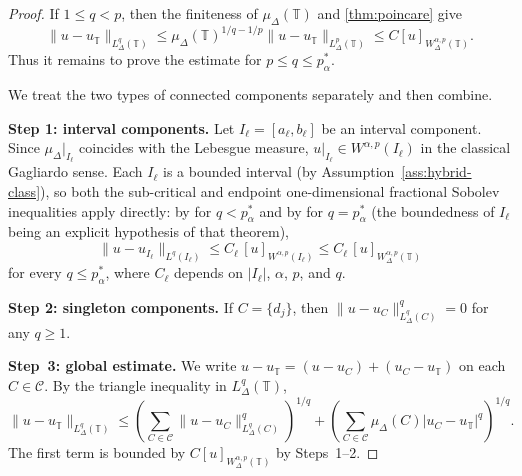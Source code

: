 \documentclass[11pt,a4paper]{article}
\numberwithin{equation}{section}
\theoremstyle{definition}
\newcommand{\T}{\mathbb{T}}
\begin{document}
\begin{proof}
If $1\le q<p$, then the finiteness of $\mu_\Delta(\T)$ and \cref{thm:poincare} give
\[
\|u-u_\T\|_{L^q_\Delta(\T)}
\le \mu_\Delta(\T)^{1/q-1/p}\|u-u_\T\|_{L^p_\Delta(\T)}
\le C [u]_{W^{\alpha,p}_\Delta(\T)}.
\]
Thus it remains to prove the estimate for $p\le q\le p_\alpha^*$.

We treat the two types of connected components separately and then combine.

\medskip\noindent
\textbf{Step 1: interval components.}
Let $I_\ell=[a_\ell,b_\ell]$ be an interval component. Since
$\mu_\Delta|_{I_\ell}$ coincides with the Lebesgue measure,
$u|_{I_\ell}\in W^{\alpha,p}(I_\ell)$ in the classical Gagliardo sense.
Each $I_\ell$ is a bounded interval (by Assumption~\ref{ass:hybrid-class}),
so both the sub-critical and endpoint one-dimensional fractional Sobolev
inequalities apply directly:
by \cite[Theorem~6.7]{DiNezzaPalatucciValdinoci2012} for $q<p^*_\alpha$
and by \cite[Theorem~8.2]{DiNezzaPalatucciValdinoci2012} for $q=p^*_\alpha$
(the boundedness of $I_\ell$ being an explicit hypothesis of that theorem),
\[
\|u - u_{I_\ell}\|_{L^q(I_\ell)}
\le C_\ell\,[u]_{W^{\alpha,p}(I_\ell)}
\le C_\ell\,[u]_{W^{\alpha,p}_\Delta(\T)}
\]
for every $q\le p^*_\alpha$, where $C_\ell$ depends on $|I_\ell|$,
$\alpha$, $p$, and $q$.

\medskip\noindent
\textbf{Step 2: singleton components.}
If $C=\{d_j\}$, then $\|u - u_C\|^q_{L^q_\Delta(C)} = 0$ for any
$q\ge 1$.

\medskip\noindent
\textbf{Step~3: global estimate.}
We write $u-u_\T=(u-u_C)+(u_C-u_\T)$ on each $C\in\mathcal C$.
By the triangle inequality in $L^q_\Delta(\T)$,
\[
\|u-u_\T\|_{L^q_\Delta(\T)}
\le
\left(\sum_{C\in\mathcal C}\|u-u_C\|^q_{L^q_\Delta(C)}\right)^{1/q}
+\left(\sum_{C\in\mathcal C}\mu_\Delta(C)|u_C-u_\T|^q\right)^{1/q}.
\]
The first term is bounded by $C[u]_{W^{\alpha,p}_\Delta(\T)}$
by Steps~1--2.


\end{proof}
\end{document}
